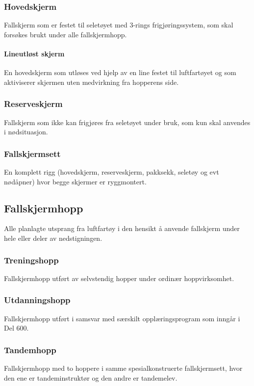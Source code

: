 \subsubsection{Hovedskjerm}
Fallskjerm som er festet til seletøyet med 3-rings frigjøringssystem, som skal forsøkes brukt under alle fallskjermhopp.

\paragraph{Lineutløst skjerm}
En hovedskjerm som utløses ved hjelp av en line festet til luftfartøyet og som aktiviserer skjermen uten medvirkning fra hopperens side.

\subsubsection{Reserveskjerm}
Fallskjerm som ikke kan frigjøres fra seletøyet under bruk, som kun skal anvendes i nødsituasjon.

\subsubsection{Fallskjermsett}
En komplett rigg (hovedskjerm, reserveskjerm, pakksekk, seletøy og evt nødåpner) hvor begge skjermer er ryggmontert.

\subsection{Fallskjermhopp}
Alle planlagte utsprang fra luftfartøy i den hensikt å anvende fallskjerm under hele eller deler av nedstigningen.

\subsubsection{Treningshopp}
Fallskjermhopp utført av selvstendig hopper under ordinær hoppvirksomhet.

\subsubsection{Utdanningshopp}
Fallskjermhopp utført i samsvar med særskilt opplæringsprogram som inngår i Del 600.

\subsubsection{Tandemhopp}
Fallskjermhopp med to hoppere i samme spesialkonstruerte fallskjermsett, hvor den ene er tandeminstruktør og den andre er tandemelev.

